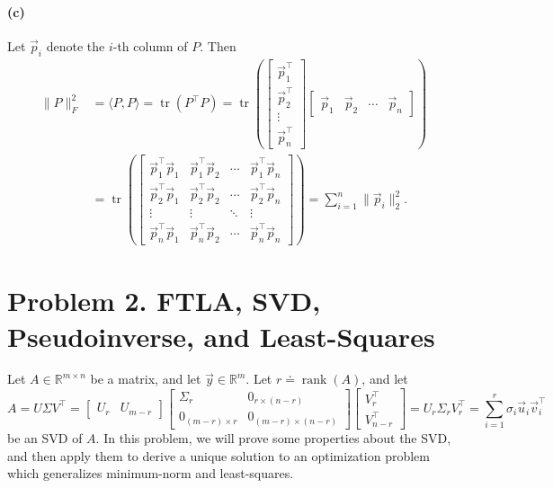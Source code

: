 \documentclass[
  12pt,
]{fphw}
\begin{document}
\paragraph{(c)} %
Let $\vec p_i$ denote the $i$-th column of $P$. Then
\begin{align*}
\|P\|_F^2 &= \langle P, P\rangle = \operatorname{tr}(P^\top P) = \operatorname{tr}\!\left(\begin{bmatrix}
\vec p_1^\top\\
\vec p_2^\top\\
\vdots\\
\vec p_n^\top
\end{bmatrix}\begin{bmatrix}
\vec p_1 & \vec p_2 & \cdots & \vec p_n
\end{bmatrix}\right) \\
&= \operatorname{tr}\!\left(\begin{bmatrix}
\vec p_1^\top \vec p_1 & \vec p_1^\top \vec p_2 & \cdots & \vec p_1^\top \vec p_n\\
\vec p_2^\top \vec p_1 & \vec p_2^\top \vec p_2 & \cdots & \vec p_2^\top \vec p_n\\
\vdots & \vdots & \ddots & \vdots\\
\vec p_n^\top \vec p_1 & \vec p_n^\top \vec p_2 & \cdots & \vec p_n^\top \vec p_n
\end{bmatrix}\right) = \sum_{i=1}^n \|\vec p_i\|_2^2.
\end{align*}





\newpage
\section*{Problem 2. FTLA, SVD, Pseudoinverse, and Least-Squares}

Let $A \in \mathbb{R}^{m\times n}$ be a matrix, and let $\vec y \in \mathbb{R}^m$.
Let $r \doteq \operatorname{rank}(A)$, and let
\[
A = U\Sigma V^\top
=
\begin{bmatrix}
U_r & U_{m-r}
\end{bmatrix}
\begin{bmatrix}
\Sigma_r & 0_{r\times (n-r)}\\
0_{(m-r)\times r} & 0_{(m-r)\times (n-r)}
\end{bmatrix}
\begin{bmatrix}
V_r^\top\\
V_{n-r}^\top
\end{bmatrix}
=
U_r \Sigma_r V_r^\top
=
\sum_{i=1}^r \sigma_i \vec u_i \vec v_i^\top
\tag{3}
\]
be an SVD of $A$. In this problem, we will prove some properties about the SVD, and then apply them to derive
a unique solution to an optimization problem which generalizes minimum-norm and least-squares.
\end{document}
